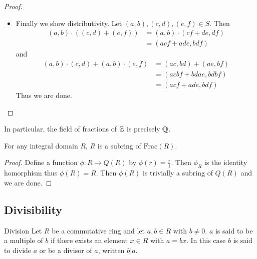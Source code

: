 \documentclass[a4paper]{article}
\begin{document}
\begin{prp}{}{}
\begin{proof}
\begin{itemize}
\item Finally we show distributivity. Let $(a,b),(c,d),(e,f)\in S$. Then 
\begin{align*}
(a,b)\cdot((c,d)+(e,f))&=(a,b)\cdot(cf+de,df)\\
&=(acf+ade,bdf)
\end{align*}
and 
\begin{align*}
(a,b)\cdot(c,d)+(a,b)\cdot(e,f)&=(ac,bd)+(ae,bf)\\
&=(acbf+bdae,bdbf)\\
&=(acf+ade,bdf)\tag{equivalence relation}
\end{align*}
Thus we are done. 
\end{itemize}
\end{proof}
\end{prp}

In particular, the field of fractions of $\mathbb{Z}$ is precisely $\mathbb{Q}$. 

\begin{lmm}{}{} For any integral domain $R$, $R$ is a subring of $\text{Frac}(R)$. \tcbline
\begin{proof}
Define a function $\phi:R\to Q(R)$ by $\phi(r)=\frac{r}{1}$. Then $\phi_R$ is the identity homorphism thus $\phi(R)=R$. Then $\phi(R)$ is trivially a subring of $Q(R)$ and we are done. 
\end{proof}
\end{lmm}

\subsection{Divisibility}
\begin{defn}{Division}{} Let $R$ be a commutative ring and let $a,b\in R$ with $b\neq 0$. $a$ is said to be a multiple of $b$ if there exists an element $x\in R$ with $a=bx$. In this case $b$ is said to divide $a$ or be a divisor of $a$, written $b|a$. 
\end{defn}
\end{document}
